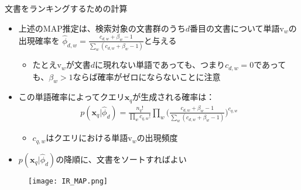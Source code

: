 \documentclass[aspectratio=169,unicode,dvipdfmx,14pt]{beamer}
\begin{document}
\begin{frame}{文書をランキングするための計算}
\begin{itemize}
\item 上述のMAP推定は、検索対象の文書群のうち$d$番目の文書について単語$\mbox{v}_w$の出現確率を
$\hat{\phi}_{d,w} = \frac{c_{d,w} + \beta_w - 1}{\sum_w (c_{d,w} + \beta_w - 1)}$と与える
\begin{itemize}
\item たとえ$\mbox{v}_w$が文書$d$に現れない単語であっても、つまり$c_{d,w}=0$であっても、$\beta_w > 1$ならば確率がゼロにならないことに注意
\end{itemize}
\item この単語確率によってクエリ$\bm{x}_q$が生成される確率は：
\begin{align}
p(\bm{x}_q | \hat{\phi}_d) = \frac{n_q!}{\prod_w c_{q,w}!}
\prod_w \bigg( \frac{c_{d,w} + \beta_w - 1}{\sum_w (c_{d,w} + \beta_w - 1)} \bigg)^{c_{q,w}}
\end{align}
\begin{itemize}
\item $c_{q,w}$はクエリにおける単語$\mbox{v}_w$の出現頻度
\end{itemize}
\item $p(\bm{x}_q | \hat{\phi}_d)$の降順に、文書をソートすればよい
\end{itemize}
\end{frame}

\begin{frame}
\begin{figure}[htbp]
\begin{center}
\texttt{[image: IR\_MAP.png]}
\label{}
\end{center}
\end{figure}
\end{frame}
\end{document}
